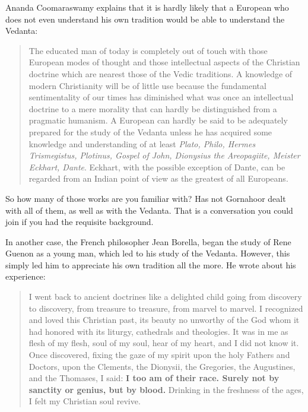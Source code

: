 \begin{footnotesize}
\begin{sffamily}
Ananda Coomaraswamy explains that it is hardly likely that a European who does not even understand his own tradition would be able to understand the Vedanta:

\begin{quote}\footnotesize

The educated man of today is completely out of touch with those European modes of thought and those intellectual aspects of the Christian doctrine which are nearest those of the Vedic traditions. A knowledge of modern Christianity will be of little use because the fundamental sentimentality of our times has diminished what was once an intellectual doctrine to a mere morality that can hardly be distinguished from a pragmatic humanism. A European can hardly be said to be adequately prepared for the study of the Vedanta unless he has acquired some knowledge and understanding of at least \emph{Plato, Philo, Hermes Trismegistus, Plotinus, Gospel of John, Dionysius the Areopagiite, Meister Eckhart, Dante}. Eckhart, with the possible exception of Dante, can be regarded from an Indian point of view as the greatest of all Europeans.
\end{quote}


So how many of those works are you familiar with? Has not Gornahoor dealt with all of them, as well as with the Vedanta. That is a conversation you could join if you had the requisite background.

In another case, the French philosopher Jean Borella, began the study of Rene Guenon as a young man, which led to his study of the Vedanta. However, this simply led him to appreciate his own tradition all the more. He wrote about his experience:

\begin{quote}\footnotesize

I went back to ancient doctrines like a delighted child going from discovery to discovery, from treasure to treasure, from marvel to marvel. I recognized and loved this Christian past, its beauty no unworthy of the God whom it had honored with its liturgy, cathedrals and theologies. It was in me as flesh of my flesh, soul of my soul, hear of my heart, and I did not know it. Once discovered, fixing the gaze of my spirit upon the holy Fathers and Doctors, upon the Clements, the Dionysii, the Gregories, the Augustines, and the Thomases, I said: \textbf{I too am of their race. Surely not by sanctity or genius, but by blood.} Drinking in the freshness of the ages, I felt my Christian soul revive.
\end{quote}

\hfill

\end{sffamily}
\end{footnotesize}

